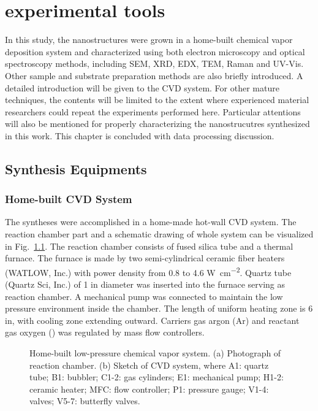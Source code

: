 
\chapter{experimental tools}

In this study, the nanostructures were grown in a home-built chemical vapor deposition system and characterized using both electron microscopy and optical spectroscopy methods, including SEM, XRD, EDX, TEM, Raman and UV-Vis. Other sample and substrate preparation methods are also briefly introduced. A detailed introduction will be given to the CVD system. For other mature techniques, the contents will be limited to the extent where experienced material researchers could repeat the experiments performed here. Particular attentions will also be mentioned for properly characterizing the nanostrucutres synthesized in this work. This chapter is concluded with data processing discussion. 

\section{Synthesis Equipments}
\subsection{Home-built CVD System}
The syntheses were accomplished in a home-made hot-wall CVD system. The reaction chamber part and a schematic drawing of whole system can be visualized in Fig.~\ref{fig:ch2cvd}.  The reaction chamber consists of fused silica tube and a thermal furnace. The furnace is made by two semi-cylindrical ceramic fiber heaters (WATLOW, Inc.) with power density from 0.8 to 4.6 \si{W cm^{-2}}. Quartz tube (Quartz Sci, Inc.) of 1 in diameter was inserted into the furnace serving as reaction chamber. A mechanical pump was connected to maintain the low pressure environment inside the chamber. The length of uniform heating zone is 6 in, with cooling zone extending outward. Carriers gas argon (Ar) and reactant gas oxygen () was regulated by mass flow controllers.

\begin{figure}[htb]
\centering
{}

\caption[CVD system]{Home-built low-pressure chemical vapor system. (a) Photograph of reaction chamber. (b) Sketch of CVD system, where A1: quartz tube; B1: bubbler; C1-2: gas cylinders; E1: mechanical pump; H1-2: ceramic heater; MFC: flow controller; P1: pressure gauge; V1-4: valves; V5-7: butterfly valves.}
\label{fig:ch2cvd}
\end{figure}

